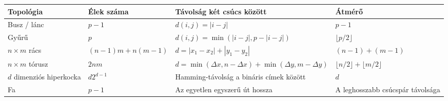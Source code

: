 {\small
\begin{tabularx}{\textwidth}{L{28mm}L{30mm}X L{25mm}}
\toprule
\textbf{Topológia} & \textbf{Élek száma} & \textbf{Távolság két csúcs között} & \textbf{Átmérő} \\
\midrule
Busz / lánc & $p-1$ & $d(i,j)=|i-j|$ & $p-1$ \\
Gyűrű & $p$ & $d(i,j)=\min(|i-j|,p-|i-j|)$ & $\lfloor p/2\rfloor$ \\
$n\times m$ rács & $(n-1)m+n(m-1)$ & $d=|x_1-x_2|+|y_1-y_2|$ & $(n-1)+(m-1)$ \\
$n\times m$ tórusz & $2nm$ & $d=\min(\Delta x,n-\Delta x)+\min(\Delta y,m-\Delta y)$ & $\lfloor n/2\rfloor+\lfloor m/2\rfloor$ \\
$d$ dimenziós hiperkocka & $d2^{d-1}$ & Hamming-távolság a bináris címek között & $d$ \\
Fa & $p-1$ & Az egyetlen egyszerű út hossza & A leghosszabb csúcspár távolsága \\
\bottomrule
\end{tabularx}
}
